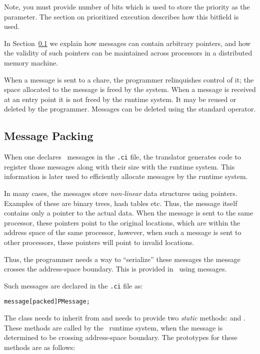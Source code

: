 Note, you must provide number of bits which is used to store the priority as
the  parameter. The section on prioritized execution describes how
this bitfield is used.

In Section~\ref{message packing} we explain how messages can contain arbitrary
pointers, and how the validity of such pointers can be maintained across
processors in a distributed memory machine.

When a message  is sent to a chare, the programmer
relinquishes control of it; the space allocated to the message is freed by the
system.  When a message is received at an entry point it is not freed by the
runtime system.  It may be reused or deleted by the programmer.  Messages can
be deleted using the standard \CC{}  operator.  


\subsection{Message Packing}
\label{message packing}

When one declares \charmpp\ messages in the \texttt{.ci} file, the translator
generates code to register those messages along with their size with the
runtime system. This information is later used to efficiently allocate messages
by the runtime system.

In many cases, the messages store {\em non-linear} data structures using
pointers.  Examples of these are binary trees, hash tables etc. Thus, the
message itself contains only a pointer to the actual data. When the message is
sent to the same processor, these pointers point to the original locations,
which are within the address space of the same processor, however, when such a
message is sent to other processors, these pointers will point to invalid
locations.

Thus, the programmer needs a way to ``serialize'' these messages
 the
message crosses the address-space boundary. This is provided in \charmpp\ using
 messages.

Such messages are declared in the {\tt .ci} file as:

\begin{alltt}
message [packed] PMessage;
\end{alltt}

The class  needs to inherit from  and needs
to provide two {\em static} methods:  and . These methods
are called by the \charmpp\ runtime system, when the message is determined to
be crossing address-space boundary. The prototypes for these methods are as
follows:

